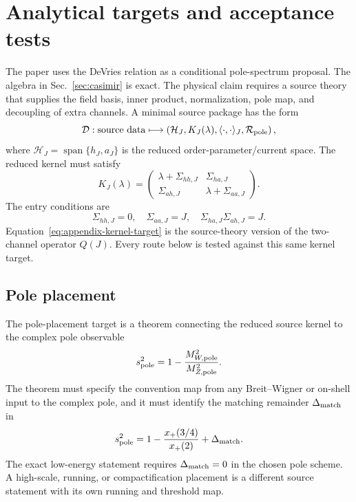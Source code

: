 \section{Analytical targets and acceptance tests}
\label{app:theorem-targets}

The paper uses the DeVries relation as a conditional pole-spectrum proposal.
The algebra in Sec.~\ref{sec:casimir} is exact.  The physical claim requires a
source theory that supplies the field basis, inner product, normalization, pole
map, and decoupling of extra channels.  A minimal source package has the form
\begin{equation}
  \mathcal D:
  \hbox{source data}
  \longmapsto
  \left(\mathcal H_J,K_J(\lambda),\langle\cdot,\cdot\rangle_J,
  \mathcal R_{\rm pole}\right),
  \label{eq:appendix-source-package}
\end{equation}
where \(\mathcal H_J=\operatorname{span}\{h_J,a_J\}\) is the reduced
order-parameter/current space.  The reduced kernel must satisfy
\begin{equation}
  K_J(\lambda)=
  \begin{pmatrix}
  \lambda+\Sigma_{hh,J} & \Sigma_{ha,J}\\
  \Sigma_{ah,J} & \lambda+\Sigma_{aa,J}
  \end{pmatrix}.
  \label{eq:appendix-kernel-target}
\end{equation}
The entry conditions are
\begin{equation}
  \Sigma_{hh,J}=0,\quad
  \Sigma_{aa,J}=J,\quad
  \Sigma_{ha,J}\Sigma_{ah,J}=J .
  \label{eq:appendix-kernel-entries}
\end{equation}
Equation~\eqref{eq:appendix-kernel-target} is the source-theory version of
the two-channel operator \(Q(J)\).  Every route below is tested against this
same kernel target.

\subsection{Pole placement}
\label{app:target-pole-placement}

The pole-placement target is a theorem connecting the reduced source kernel to
the complex pole observable
\begin{equation}
  s^2_{\rm pole}=1-\frac{M_{W,\rm pole}^2}{M_{Z,\rm pole}^2}.
  \label{eq:appendix-pole-target}
\end{equation}
The theorem must specify the convention map from any Breit--Wigner or
on-shell input to the complex pole, and it must identify the matching remainder
\(\Delta_{\rm match}\) in
\begin{equation}
  s^2_{\rm pole}
  =
  1-\frac{x_+(3/4)}{x_+(2)}
  +\Delta_{\rm match}.
  \label{eq:appendix-pole-remainder}
\end{equation}
The exact low-energy statement requires \(\Delta_{\rm match}=0\) in the
chosen pole scheme.  A high-scale, running, or compactification placement is a
different source statement with its own running and threshold map.

